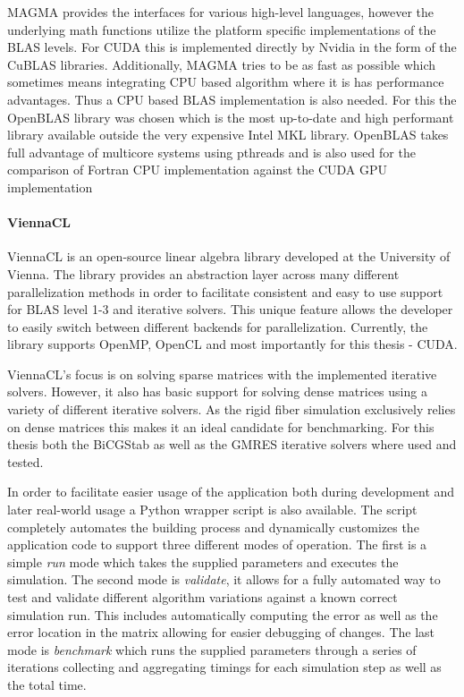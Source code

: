\documentclass[a4paper,11pt]{kth-mag}
\begin{document}
MAGMA provides the interfaces for various high-level languages, however the underlying math functions utilize the platform specific implementations of the BLAS levels. For CUDA this is implemented directly by Nvidia in the form of the CuBLAS libraries. Additionally, MAGMA tries to be as fast as possible which sometimes means integrating CPU based algorithm where it is has performance advantages. Thus a CPU based BLAS implementation is also needed. For this the OpenBLAS library was chosen which is the most up-to-date and high performant library available outside the very expensive Intel MKL library. OpenBLAS takes full advantage of multicore systems using pthreads and is also used for the comparison of Fortran CPU implementation against the CUDA GPU implementation

\paragraph{ViennaCL}
ViennaCL is an open-source linear algebra library developed at the University of Vienna. The library provides an abstraction layer across many different parallelization methods in order to facilitate consistent and easy to use support for BLAS level 1-3 and iterative solvers. This unique feature allows the developer to easily switch between different backends for parallelization. Currently, the library supports OpenMP, OpenCL and most importantly for this thesis - CUDA.

ViennaCL's focus is on solving sparse matrices with the implemented iterative solvers. However, it also has basic support for solving dense matrices using a variety of different iterative solvers. As the rigid fiber simulation exclusively relies on dense matrices this makes it an ideal candidate for benchmarking. For this thesis both the BiCGStab as well as the GMRES iterative solvers where used and tested.

In order to facilitate easier usage of the application both during development and later real-world usage a Python wrapper script is also available. The script completely automates the building process and dynamically customizes the application code to support three different modes of operation. The first is a simple \emph{run} mode which takes the supplied parameters and executes the simulation. The second mode is \emph{validate}, it allows for a fully automated way to test and validate different algorithm variations against a known correct simulation run. This includes automatically computing the error as well as the error location in the matrix allowing for easier debugging of changes. The last mode is \emph{benchmark} which runs the supplied parameters through a series of iterations collecting and aggregating timings for each simulation step as well as the total time.
\end{document}
